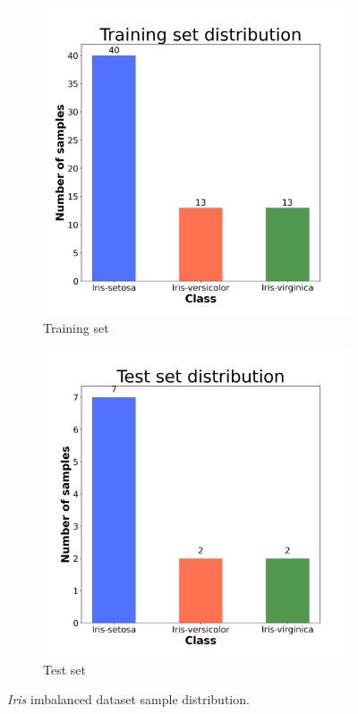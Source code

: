 \begin{figure}[H]
    \centering
    \begin{subfigure}[t]{0.45\textwidth}
        \centering
        \includegraphics[width=1\textwidth]{images/exper2/iris/train_dist.png}
        \caption{Training set}
    \end{subfigure}
    \begin{subfigure}[t]{0.45\textwidth}
        \centering
        \includegraphics[width=1\textwidth]{images/exper2/iris/test_dist.png}
        \caption{Test set}
    \end{subfigure}
    \caption{\textit{Iris} imbalanced dataset sample distribution.}
\end{figure}

